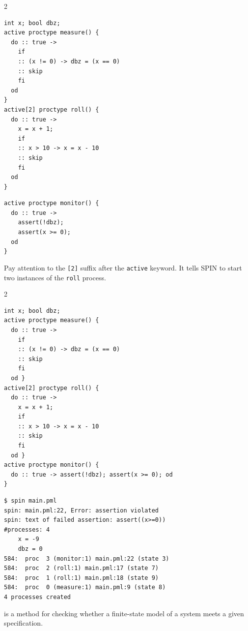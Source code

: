 \documentclass{article}
\begin{document}
\begin{pptWide}{2}
{\scriptsize\begin{verbatim}
int x; bool dbz;
active proctype measure() {
  do :: true ->
    if
    :: (x != 0) -> dbz = (x == 0)
    :: skip
    fi
  od
}
active[2] proctype roll() {
  do :: true ->
    x = x + 1;
    if
    :: x > 10 -> x = x - 10
    :: skip
    fi
  od
}
\end{verbatim}
}
\par\columnbreak\par
{\scriptsize\begin{verbatim}
active proctype monitor() {
  do :: true ->
    assert(!dbz);
    assert(x >= 0);
  od
}
\end{verbatim}
}

Pay attention to the \texttt{[2]} suffix after the \texttt{active}
keyword. It tells SPIN to start two instances of the \texttt{roll} process.
\end{pptWide}

\plush{}


\begin{pptWide}{2}
{\scriptsize\begin{verbatim}
int x; bool dbz;
active proctype measure() {
  do :: true ->
    if
    :: (x != 0) -> dbz = (x == 0)
    :: skip
    fi
  od }
active[2] proctype roll() {
  do :: true ->
    x = x + 1;
    if
    :: x > 10 -> x = x - 10
    :: skip
    fi
  od }
active proctype monitor() {
  do :: true -> assert(!dbz); assert(x >= 0); od
}
\end{verbatim}
}
\par\columnbreak\par
{\scriptsize\begin{verbatim}
$ spin main.pml
spin: main.pml:22, Error: assertion violated
spin: text of failed assertion: assert((x>=0))
#processes: 4
    x = -9
    dbz = 0
584:  proc  3 (monitor:1) main.pml:22 (state 3)
584:  proc  2 (roll:1) main.pml:17 (state 7)
584:  proc  1 (roll:1) main.pml:18 (state 9)
584:  proc  0 (measure:1) main.pml:9 (state 8)
4 processes created
\end{verbatim}
}
\end{pptWide}

\plush{}



 is a method for checking whether a finite-state model of a system meets a given specification.
\end{document}
